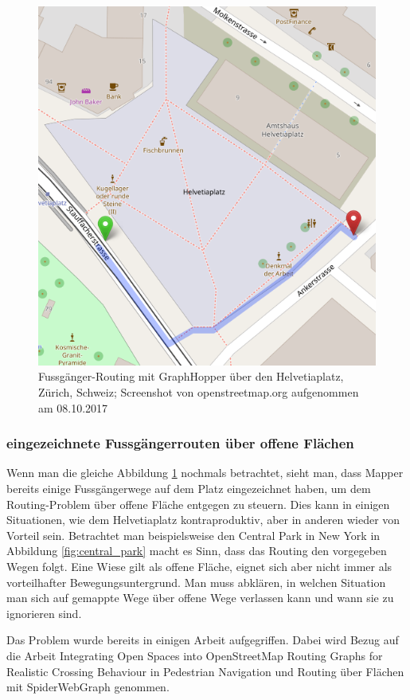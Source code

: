 \begin{figure}[ht]
	\centering
	\includegraphics[width=0.5\linewidth]{technicalreport/img/helvetiaplatz_graphhopper}
	\caption[Fussgänger-Routing]{Fussgänger-Routing mit GraphHopper über den Helvetiaplatz, Zürich, Schweiz; Screenshot von openstreetmap.org aufgenommen am 08.10.2017}
	\label{fig:helvetiaplatz_graphhopper}
\end{figure}

\subsubsection{eingezeichnete Fussgängerrouten über offene Flächen}
\label{subsub: eingezeichnete Fussgängerrouten über offene Flächen}
Wenn man die gleiche Abbildung \ref{fig:helvetiaplatz_graphhopper} nochmals betrachtet, sieht man, dass Mapper bereits einige Fussgängerwege auf dem Platz eingezeichnet haben, um dem Routing-Problem über offene Fläche entgegen zu steuern. Dies kann in einigen Situationen, wie dem Helvetiaplatz kontraproduktiv, aber in anderen wieder von Vorteil sein. Betrachtet man beispielsweise den Central Park in New York in Abbildung \ref{fig:central_park} macht es Sinn, dass das Routing den vorgegeben Wegen folgt. Eine Wiese gilt als offene Fläche, eignet sich aber nicht immer als vorteilhafter Bewegungsuntergrund. Man muss abklären, in welchen Situation man sich auf gemappte Wege über offene Wege verlassen kann und wann sie zu ignorieren sind.

Das Problem wurde bereits in einigen Arbeit aufgegriffen. Dabei wird Bezug auf die Arbeit Integrating Open Spaces into OpenStreetMap Routing Graphs for Realistic Crossing Behaviour in Pedestrian Navigation \cite{graser_visibility_graph} und Routing über Flächen mit SpiderWebGraph \cite{dzafic_spider_web_graph} genommen.

